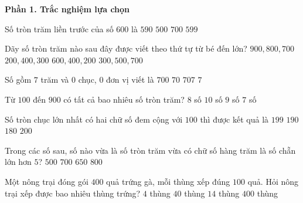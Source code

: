 \textbf{Phần 1. Trắc nghiệm lựa chọn}

\begin{ex} %
Số tròn trăm liền trước của số $600$ là
\choice
{$590$}
{\True $500$}
{$700$}
{$599$}
\end{ex}

\begin{ex} %
Dãy số tròn trăm nào sau đây được viết theo thứ tự từ bé đến lớn?
\choice
{$900, 800, 700$}
{$200, 400, 300$}
{$600, 400, 200$}
{\True $300, 500, 700$}
\end{ex}

\begin{ex} %
Số gồm $7$ trăm và $0$ chục, $0$ đơn vị viết là
\choice
{\True $700$}
{$70$}
{$707$}
{$7$}
\end{ex}

\begin{ex} %
Từ $100$ đến $900$ có tất cả bao nhiêu số tròn trăm?
\choice
{$8$ số}
{$10$ số}
{\True $9$ số}
{$7$ số}
\end{ex}

\begin{ex} %
Số tròn chục lớn nhất có hai chữ số đem cộng với $100$ thì được kết quả là
\choice
{$199$}
{\True $190$}
{$180$}
{$200$}
\end{ex}

\begin{ex} %
Trong các số sau, số nào vừa là số tròn trăm vừa có chữ số hàng trăm là số chẵn lớn hơn $5$?
\choice
{$500$}
{$700$}
{$650$}
{\True $800$}
\end{ex}

\begin{ex} %
Một nông trại đóng gói $400$ quả trứng gà, mỗi thùng xếp đúng $100$ quả. Hỏi nông trại xếp được bao nhiêu thùng trứng?
\choice
{\True $4$ thùng}
{$40$ thùng}
{$14$ thùng}
{$400$ thùng}
\end{ex}

